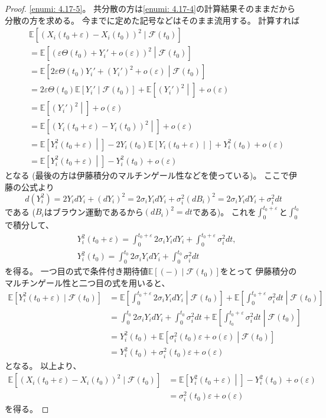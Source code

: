 \documentclass[uplatex]{jsarticle}
\theoremstyle{definition}
\def\ep{\varepsilon}
\def\E{\mathbb{E}}
\def\mcF{\mathcal{F}}
\begin{document}
\begin{proof}
  \ref{enumi: 4.17-5}。
  共分散の方は\ref{enumi: 4.17-4}の計算結果そのままだから分散の方を求める。
  今までに定めた記号などはそのまま流用する。
  計算すれば
  \begin{align*}
    &\E[(X_i(t_0+\ep) - X_i(t_0))^2\mid \mcF(t_0)] \\
    &= \E\left[ \left(\ep \Theta(t_0) + Y_i' + o(\ep)\right)^2
    \middle| \mcF(t_0)\right] \\
    &= \E\left[ 2\ep \Theta(t_0) Y_i' + (Y_i')^2 + o(\ep)
    \middle| \mcF(t_0)\right] \\
    &= 2\ep \Theta(t_0) \E\left[ Y_i' \middle| \mcF(t_0)\right]
    + \E\left[ (Y_i')^2 \middle| \right] + o(\ep) \\
    &= \E\left[ (Y_i')^2 \middle| \right] + o(\ep) \\
    &= \E\left[ (Y_i(t_0+\ep) - Y_i(t_0))^2 \middle| \right] + o(\ep) \\
    &= \E\left[ Y_i^2(t_0+\ep) \middle| \right]
    - 2Y_i(t_0)\E \left[ Y_i(t_0+\ep) \middle| \right]
    + Y_i^2(t_0) + o(\ep) \\
    &= \E\left[ Y_i^2(t_0+\ep) \middle| \right] - Y_i^2(t_0) + o(\ep)
  \end{align*}
  となる (最後の方は伊藤積分のマルチンゲール性などを使っている)。
  ここで伊藤の公式より
  \[
  d(Y_i^2) = 2Y_idY_i + (dY_i)^2
  = 2\sigma_iY_idY_i + \sigma_i^2(dB_i)^2
  = 2\sigma_iY_idY_i + \sigma_i^2dt
  \]
  である (\(B_i\)はブラウン運動であるから\((dB_i)^2 = dt\)である)。
  これを\(\int_0^{t_0+\ep}\)と\(\int_0^{t_0}\)で積分して、
  \begin{align*}
    &Y_i^2(t_0+\ep)
    = \int_0^{t_0+\ep}2\sigma_iY_idY_i + \int_0^{t_0+\ep}\sigma_i^2dt, \\
    &Y_i^2(t_0)
    = \int_0^{t_0}2\sigma_iY_idY_i + \int_0^{t_0}\sigma_i^2dt
  \end{align*}
  を得る。
  一つ目の式で条件付き期待値\(\E[(-)\mid\mcF(t_0)]\)をとって
  伊藤積分のマルチンゲール性と二つ目の式を用いると、
  \begin{align*}
    \E[Y_i^2(t_0+\ep) \mid \mcF(t_0)]
    &= \E \left[ \int_0^{t_0+\ep}2\sigma_iY_idY_i
    \middle| \mcF(t_0) \right] +
    \E \left[ \int_0^{t_0+\ep}\sigma_i^2dt \middle| \mcF(t_0)\right] \\
    &= \int_0^{t_0}2\sigma_iY_idY_i
    + \int_0^{t_0}\sigma_i^2dt +
    \E \left[ \int_{t_0}^{t_0+\ep}\sigma_i^2dt
    \middle| \mcF(t_0)\right] \\
    &= Y_i^2(t_0) +
    \E \left[ \sigma_i^2(t_0)\ep + o(\ep) \middle| \mcF(t_0)\right] \\
    &= Y_i^2(t_0) + \sigma_i^2(t_0)\ep + o(\ep)
  \end{align*}
  となる。
  以上より、
  \begin{align*}
    \E[(X_i(t_0+\ep) - X_i(t_0))^2\mid \mcF(t_0)]
    &= \E\left[ Y_i^2(t_0+\ep) \middle| \right] - Y_i^2(t_0) + o(\ep) \\
    &= \sigma_i^2(t_0)\ep + o(\ep)
  \end{align*}
  を得る。


\end{proof}
\end{document}
